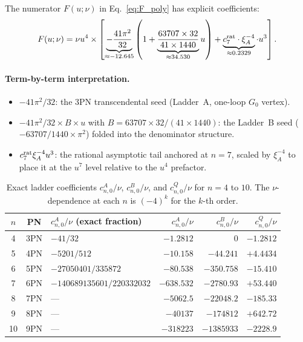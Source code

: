 \documentclass[11pt,a4paper]{article}
\theoremstyle{plain}
\theoremstyle{definition}
\theoremstyle{remark}
\newcommand{\xiA}{\xi_A}
\begin{document}
The numerator $F(u;\nu)$ in Eq.~\eqref{eq:F_poly} has explicit coefficients:
\begin{equation}
  F(u;\nu) = \nu u^4 \times \left[
    \underbrace{-\frac{41\pi^2}{32}}_{\approx -12.645}
    \left(1 + \underbrace{\frac{63707\times32}{41\times1440}}_{\approx 34.530} u\right)
    + \underbrace{c_7^{\rm rat}\cdot\xiA^{-4}}_{\approx 0.2329}\cdot u^3
  \right].
  \label{eq:F_explicit}
\end{equation}

\paragraph{Term-by-term interpretation.}
\begin{itemize}[nosep]
  \item $-41\pi^2/32$: the 3PN transcendental seed (Ladder~A, one-loop $G_0$ vertex).
  \item $-41\pi^2/32\times B\times u$ with $B=63707\times32/(41\times1440)$: the
    Ladder~B seed ($-63707/1440\times\pi^2$) folded into the denominator structure.
  \item $c_7^{\rm rat}\xiA^{-4} u^3$: the rational asymptotic tail anchored at $n=7$,
    scaled by $\xiA^{-4}$ to place it at the $u^7$ level relative to the $u^4$ prefactor.
\end{itemize}

\begin{table}[h]
\centering\small\renewcommand{\arraystretch}{1.25}
\caption{Exact ladder coefficients $c_{n,0}^A/\nu$, $c_{n,0}^B/\nu$, and $c_{n,0}^Q/\nu$
for $n=4$ to $10$.  The $\nu$-dependence at each $n$ is $(-4)^k$ for the $k$-th order.}
\label{tab:ladders}
\begin{tabular}{@{}cclrrr@{}}
\toprule
$n$ & PN & $c_{n,0}^A/\nu$ (exact fraction) & $c_{n,0}^A/\nu$ & $c_{n,0}^B/\nu$ & $c_{n,0}^Q/\nu$ \\
\midrule
4 & 3PN & $-41/32$              & $-1.2812$ & $0$        & $-1.2812$ \\
5 & 4PN & $-5201/512$           & $-10.158$ & $-44.241$  & $+4.4434$ \\
6 & 5PN & $-27050401/335872$    & $-80.538$ & $-350.758$ & $-15.410$ \\
7 & 6PN & $-140689135601/220332032$ & $-638.532$ & $-2780.93$ & $+53.440$ \\
8 & 7PN & ---                   & $-5062.5$ & $-22048.2$ & $-185.33$ \\
9 & 8PN & ---                   & $-40137$  & $-174812$  & $+642.72$ \\
10 & 9PN & ---                  & $-318223$ & $-1385933$ & $-2228.9$ \\
\bottomrule
\end{tabular}
\end{table}
\end{document}
